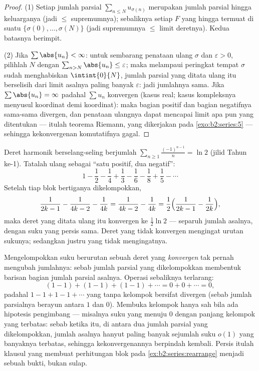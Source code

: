\begin{proof}
(1) Setiap jumlah parsial $\sum_{n \leq N} u_{\sigma(n)}$ merupakan
jumlah parsial hingga keluarganya (jadi $\leq$ supremumnya); sebaliknya
setiap $F$ yang hingga termuat di suatu $\{\sigma(0), \dots,
\sigma(N)\}$ (jadi supremumnya $\leq$ limit deretnya). Kedua batasnya berimpit.

(2) Jika $\sum\abs{u_n} < \infty$: untuk sembarang penataan ulang
$\sigma$ dan $\varepsilon > 0$, pilihlah $N$ dengan $\sum_{n >
N}\abs{u_n} \leq \varepsilon$; maka melampaui peringkat tempat $\sigma$
sudah menghabiskan $\intint{0}{N}$, jumlah parsial yang ditata ulang itu
berselisih dari limit asalnya paling banyak $\varepsilon$: jadi jumlahnya
sama. Jika $\sum \abs{u_n} = \infty$ padahal $\sum u_n$ konvergen (kasus
real; kasus kompleksnya menyusul koordinat demi koordinat): maka bagian
positif dan bagian negatifnya sama-sama divergen, dan penataan ulangnya
dapat mencapai limit apa pun yang ditentukan --- itulah teorema Riemann,
yang dikerjakan pada \cref{exo:b2:series:5} --- sehingga kekonvergenan
komutatifnya gagal.
\end{proof}

\begin{example}\label{ex:b2:series:rearrange}
Deret harmonik berselang-seling berjumlah
$\sum_{n\geq1}\frac{(-1)^{n-1}}{n} = \ln 2$ (jilid Tahun
ke-1). Tatalah ulang sebagai ``satu positif, dua negatif'':
\[
1 - \frac12 - \frac14 + \frac13 - \frac16 - \frac18 + \frac15 -
\cdots
\]
Setelah tiap blok bertiganya dikelompokkan,
\[
\frac{1}{2k-1} - \frac{1}{4k-2} - \frac1{4k}
= \frac{1}{4k-2} - \frac{1}{4k}
= \frac12\Bigl(\frac{1}{2k-1} - \frac1{2k}\Bigr),
\]
maka deret yang ditata ulang itu konvergen ke $\frac12\ln 2$ --- separuh
jumlah asalnya, dengan suku yang persis sama. Deret yang tidak
konvergen  mengingat urutan sukunya; sedangkan  justru yang tidak mengingatnya.
\end{example}

\begin{example}\label{ex:b2:series:grouping}
Mengelompokkan suku berurutan sebuah deret yang \emph{konvergen} tak
pernah mengubah jumlahnya: sebab jumlah parsial yang dikelompokkan
membentuk barisan bagian jumlah parsial asalnya. Operasi sebaliknya
terlarang:
\[
(1 - 1) + (1 - 1) + (1 - 1) + \cdots = 0 + 0 + \cdots = 0,
\]
padahal $1 - 1 + 1 - 1 + \cdots$ yang tanpa kelompok bersifat divergen
(sebab jumlah parsialnya berayun antara $1$ dan $0$). Membuka kelompok
hanya sah bila ada hipotesis pengimbang --- misalnya suku yang
menuju $0$ dengan panjang kelompok yang terbatas: sebab ketika itu, di
antara dua jumlah parsial yang dikelompokkan, jumlah asalnya hanyut
paling banyak sejumlah suku $o(1)$ yang banyaknya terbatas, sehingga
kekonvergenannya berpindah kembali. Persis itulah klausul yang membuat
perhitungan blok pada \cref{ex:b2:series:rearrange} menjadi sebuah bukti,
bukan sulap.
\end{example}


